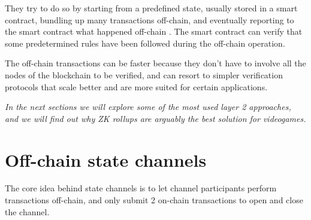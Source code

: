 \documentclass[11pt]{article}
\begin{document}
They try to do so by starting from a predefined state, usually stored in a smart contract, bundling up many transactions off-chain, and eventually reporting to the smart contract what happened off-chain \cite{ethereum_layer2}.
The smart contract can verify that some predetermined rules have been followed during the off-chain operation. 

The off-chain transactions can be faster because they don't have to involve all the nodes of the blockchain to be verified, and can resort to simpler verification protocols that scale better and are more suited for certain applications.

\emph{In the next sections we will explore some of the most used layer 2 approaches, and we will find out why ZK rollups are arguably the best solution for videogames.}

\section{Off-chain state channels} \label{section:ocsc}
The core idea behind state channels is to let channel participants perform transactions off-chain, and only submit 2 on-chain transactions to open and close the channel.
\end{document}
